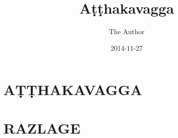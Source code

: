 \documentclass[
  final,
  pagePreset=tallpage,
  babelLanguage=slovene,
]{anecdote}
\title{Aṭṭhakavagga}
\subtitle{}
\author{The Author}
\date{2014-11-27}
\begin{document}
\frontmatter





\cleartorecto
\tableofcontents*



\mainmatter


\cleartorecto
\part{AṬṬHAKAVAGGA}

%


















\appendix

\cleartorecto

\part{RAZLAGE}

%




%

%

\newpage\thispagestyle{empty}\mbox{}
\end{document}
